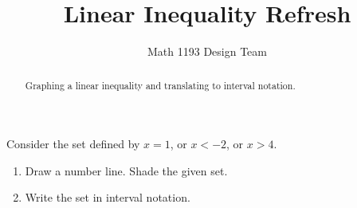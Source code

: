 \documentclass[noauthor]{ximera}
\title{Linear Inequality Refresh}
\author{Math 1193 Design Team}
\begin{document}
\begin{abstract}
    Graphing a linear inequality and translating to interval notation.
\end{abstract}
\maketitle

Consider the set defined by \(x = 1\), or \(x < -2\), or \(x > 4\).

\begin{enumerate}
    \item Draw a number line. Shade the given set.
    \item Write the set in interval notation.
\end{enumerate}
\end{document}
